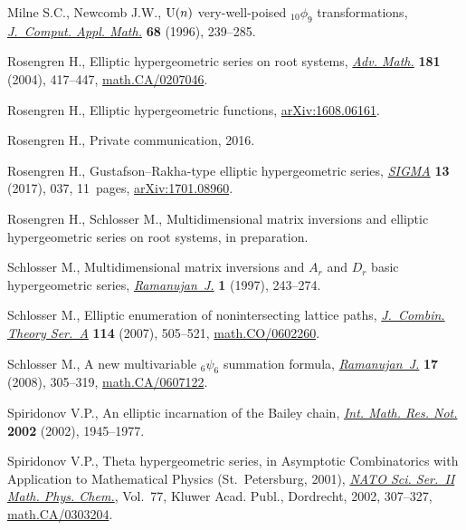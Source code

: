 \documentclass[pdftex]{sigma}
\numberwithin{equation}{section}
\begin{document}
\begin{thebibliography}{99}
Milne S.C., Newcomb J.W., {${\rm U}(n)$} very-well-poised {$_{10}\phi_9$}
 transformations, \href{https://doi.org/10.1016/0377-0427(95)00248-0}{\textit{J.~Comput. Appl. Math.}} \textbf{68} (1996),
 239--285.

Rosengren H., Elliptic hypergeometric series on root systems, \href{https://doi.org/10.1016/S0001-8708(03)00071-9}{\textit{Adv.
 Math.}} \textbf{181} (2004), 417--447, \href{https://arxiv.org/abs/math.CA/0207046}{math.CA/0207046}.

Rosengren H., Elliptic hypergeometric functions, \href{https://arxiv.org/abs/1608.06161}{arXiv:1608.06161}.


Rosengren H., {P}rivate communication, 2016.

Rosengren H., Gustafson--{R}akha-type elliptic hypergeometric series,
 \href{https://doi.org/10.3842/SIGMA.2017.037}{\textit{SIGMA}} \textbf{13} (2017), 037, 11~pages, \href{https://arxiv.org/abs/1701.08960}{arXiv:1701.08960}.

Rosengren H., Schlosser M., Multidimensional matrix inversions and elliptic
 hypergeometric series on root systems, {i}n preparation.

Schlosser M., Multidimensional matrix inversions and {$A_r$} and {$D_r$} basic
 hypergeometric series, \href{https://doi.org/10.1023/A:1009705129155}{\textit{Ramanujan~J.}} \textbf{1} (1997), 243--274.

Schlosser M., Elliptic enumeration of nonintersecting lattice paths,
 \href{https://doi.org/10.1016/j.jcta.2006.07.002}{\textit{J.~Combin. Theory Ser.~A}} \textbf{114} (2007), 505--521,
 \href{https://arxiv.org/abs/math.CO/0602260}{math.CO/0602260}.

Schlosser M., A new multivariable {$_6\psi_6$} summation formula,
 \href{https://doi.org/10.1007/s11139-007-9017-9}{\textit{Ramanujan~J.}} \textbf{17} (2008), 305--319, \href{https://arxiv.org/abs/math.CA/0607122}{math.CA/0607122}.

Spiridonov V.P., An elliptic incarnation of the {B}ailey chain, \href{https://doi.org/10.1155/S1073792802205127}{\textit{Int.
 Math. Res. Not.}} \textbf{2002} (2002), 1945--1977.

Spiridonov V.P., Theta hypergeometric series, in Asymptotic Combinatorics with
 Application to Mathematical Physics ({S}t.~{P}etersburg, 2001), \href{https://doi.org/10.1007/978-94-010-0575-3_15}{\textit{NATO
 Sci. Ser.~II Math. Phys. Chem.}}, Vol.~77, Kluwer Acad. Publ., Dordrecht,
 2002, 307--327, \href{https://arxiv.org/abs/math.CA/0303204}{math.CA/0303204}.


\end{thebibliography}
\end{document}
